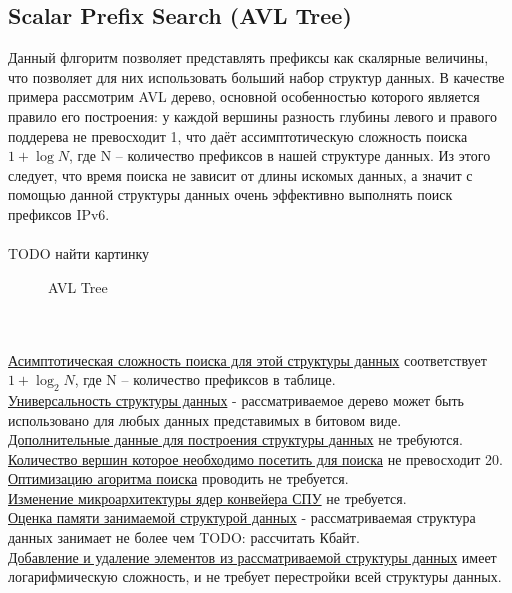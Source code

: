 \documentclass[a4peper, 12pt, titlepage, finall]{extreport}
\begin{document}
        \subsection{Scalar Prefix Search (AVL Tree)}
            Данный флгоритм позволяет представлять префиксы как скалярные величины, что позволяет для них использовать больший набор структур данных. 
            В качестве примера рассмотрим AVL дерево, основной особенностью которого является правило его построения: у каждой вершины разность 
            глубины левого и правого поддерева не превосходит 1, что даёт ассимптотическую сложность поиска {\ttfamily $1+\log{N}$}, 
            где {\ttfamily N} -- количество префиксов в нашей структуре данных. Из этого следует, что время поиска не зависит от длины искомых данных,
            а значит с помощью данной структуры данных очень эффективно выполнять поиск префиксов IPv6.
            \\
            \\
            {\ttfamily TODO найти картинку}
            \begin{figure}[h]
                \caption{AVL Tree}
                \label{fig:mesh5}
            \end{figure}
            \\
            \\
            \underline{Асимптотическая сложность поиска для этой структуры данных} соответствует {\ttfamily $1 + \log_2{N}$},
            где {\ttfamily N} -- количество префиксов в таблице.\\
            \underline{Универсальность структуры данных} - рассматриваемое дерево может быть использовано для любых данных представимых в битовом виде.\\
            \underline{Дополнительные данные для построения структуры данных} не требуются.\\
            \underline{Количество вершин которое необходимо посетить для поиска} не превосходит 20.\\
            \underline{Оптимизацию агоритма поиска} проводить не требуется.\\
            \underline{Изменение микроархитектуры ядер конвейера СПУ} не требуется.\\
            \underline{Оценка памяти занимаемой структурой данных} - рассматриваемая структура данных занимает не более чем {\ttfamily TODO: рассчитать} Кбайт.\\
            \underline{Добавление и удаление элементов из рассматриваемой структуры данных} имеет логарифмическую сложность, и не требует перестройки всей структуры данных.\\
\end{document}
